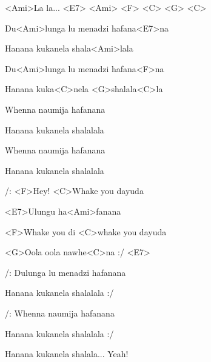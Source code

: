 

\zr

<Ami>La la... <E7> <Ami> <F> <C> <G> <C>
\kr

\zs
Du<Ami>lunga lu menadzi hafana<E7>na

Hanana kukanela shala<Ami>lala

Du<Ami>lunga lu menadzi hafana<F>na

Hanana kuka<C>nela <G>shalala<C>la
\ks


\zs
Whenna naumija hafanana

Hanana kukanela shalalala

Whenna naumija hafanana

Hanana kukanela shalalala
\ks

\zs
/: <F>Hey! <C>Whake you dayuda

<E7>Ulungu ha<Ami>fanana

<F>Whake you di <C>whake you dayuda

<G>Oola oola nawhe<C>na :/ <E7>
\ks

\zr \kr

\zs
/: Dulunga lu menadzi hafanana

Hanana kukanela shalalala :/

/: Whenna naumija hafanana

Hanana kukanela shalalala :/
\ks

\zr \kr


Hanana kukanela shalala... Yeah!

\kp
